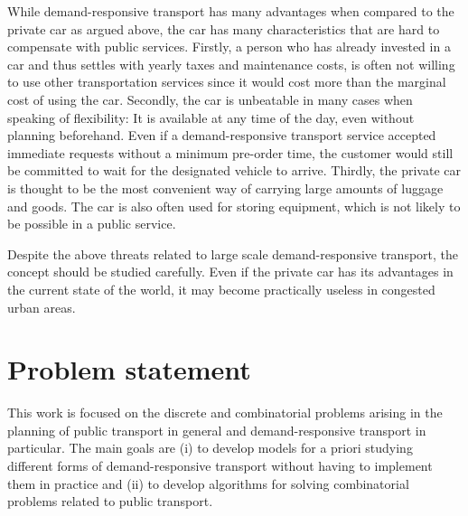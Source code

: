 \documentclass[dissertation,draft*]{aaltoseries}
\begin{document}
While demand-responsive transport has many advantages when compared to the private car as argued above,
the car has many characteristics that are hard to compensate with public services. 
Firstly, a person who has already invested in a car and thus settles with yearly taxes and
maintenance costs, is often not willing to use other transportation services since it would
cost more than the marginal cost of using the car.
Secondly, the car is unbeatable in many cases when speaking of flexibility: 
It is available at any time of the day, even without planning beforehand. 
Even if a demand-responsive transport service accepted immediate requests without
a minimum pre-order time, the customer would still be committed to wait for the 
designated vehicle to arrive. Thirdly, the private car is thought to be the most convenient 
way of carrying large amounts of luggage and goods. The car is also often used for
storing equipment, which is not likely to be possible in a public service. 

Despite the above threats related to large scale 
demand-responsive transport, the concept should be studied carefully.
Even if the private car has its advantages in the current state of the world,
it may become practically useless in congested urban areas.

%
%
%
%
%
%
%
%
%
%
%
%
%

\section{Problem statement}
This work is focused on the discrete and combinatorial problems arising in the planning of
public transport in general and demand-responsive transport in particular. The main goals are (i) to develop models for a priori studying 
different forms of demand-responsive transport without having to implement them in practice and (ii) to
develop algorithms for solving combinatorial problems related to public transport.
\end{document}
